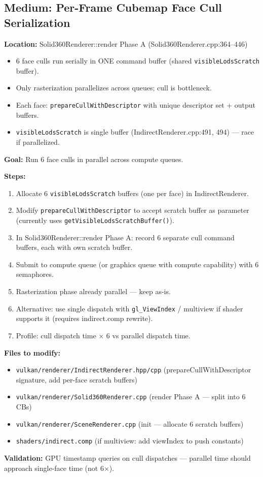 \documentclass[11pt,a4paper]{article}
\begin{document}
\subsection{Medium: Per-Frame Cubemap Face Cull Serialization}
\textbf{Location:} Solid360Renderer::render Phase A (Solid360Renderer.cpp:364–446)

\begin{itemize}
    \item 6 face culls run serially in ONE command buffer (shared \texttt{visibleLodsScratch} buffer).
    \item Only rasterization parallelizes across queues; cull is bottleneck.
    \item Each face: \texttt{prepareCullWithDescriptor} with unique descriptor set + output buffers.
    \item \texttt{visibleLodsScratch} is single buffer (IndirectRenderer.cpp:491, 494) — race if parallelized.
\end{itemize}

\begin{tcolorbox}[promptbox={Prompt: Parallelize Cubemap Face Culling}]
\textbf{Goal:} Run 6 face culls in parallel across compute queues.

\textbf{Steps:}
\begin{enumerate}
    \item Allocate 6 \texttt{visibleLodsScratch} buffers (one per face) in IndirectRenderer.
    \item Modify \texttt{prepareCullWithDescriptor} to accept scratch buffer as parameter (currently uses \texttt{getVisibleLodsScratchBuffer()}).
    \item In Solid360Renderer::render Phase A: record 6 separate cull command buffers, each with own scratch buffer.
    \item Submit to compute queue (or graphics queue with compute capability) with 6 semaphores.
    \item Rasterization phase already parallel — keep as-is.
    \item Alternative: use single dispatch with \texttt{gl\_ViewIndex} / multiview if shader supports it (requires indirect.comp rewrite).
    \item Profile: cull dispatch time × 6 vs parallel dispatch time.
\end{enumerate}

\textbf{Files to modify:}
\begin{itemize}
    \item \texttt{vulkan/renderer/IndirectRenderer.hpp/cpp} (prepareCullWithDescriptor signature, add per-face scratch buffers)
    \item \texttt{vulkan/renderer/Solid360Renderer.cpp} (render Phase A — split into 6 CBs)
    \item \texttt{vulkan/renderer/SceneRenderer.cpp} (init — allocate 6 scratch buffers)
    \item \texttt{shaders/indirect.comp} (if multiview: add viewIndex to push constants)
\end{itemize}

\textbf{Validation:} GPU timestamp queries on cull dispatches — parallel time should approach single-face time (not 6×).
\end{tcolorbox}
\end{document}
